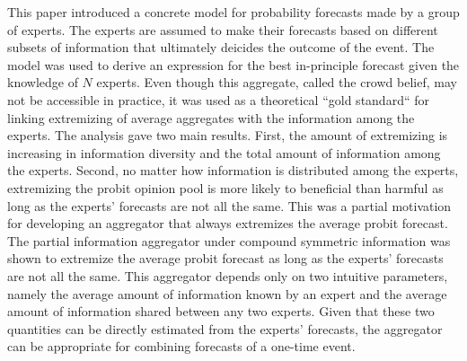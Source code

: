 \documentclass[11pt]{article}
\theoremstyle{definition}
\theoremstyle{definition}
\begin{document}


This paper introduced a concrete model for probability forecasts made by a group of experts. The experts are assumed to make their forecasts based on different subsets of information that ultimately deicides the outcome of the event. The model was used to derive an expression for the best in-principle forecast given the knowledge of $N$ experts. Even though this aggregate, called the crowd belief, may not be accessible in practice, it was used as a theoretical ``gold standard`` for linking extremizing of average aggregates with the information among the experts. The analysis gave two main results. First, the amount of extremizing is increasing in information diversity and the total amount of information among the experts. Second, no matter how information is distributed among the experts, extremizing the probit opinion pool is more likely to beneficial than harmful as long as the experts' forecasts are not all the same. This was a partial motivation for developing an aggregator that always extremizes the average probit forecast. The partial information aggregator under compound symmetric information was shown to extremize the average probit forecast as long as the experts' forecasts are not all the same. This aggregator depends only on two intuitive parameters, namely the average amount of information known by an expert and the average amount of information shared between any two experts. Given that these two quantities can be directly estimated from the experts' forecasts, the aggregator can be appropriate for combining forecasts of a one-time event. 
\end{document}
